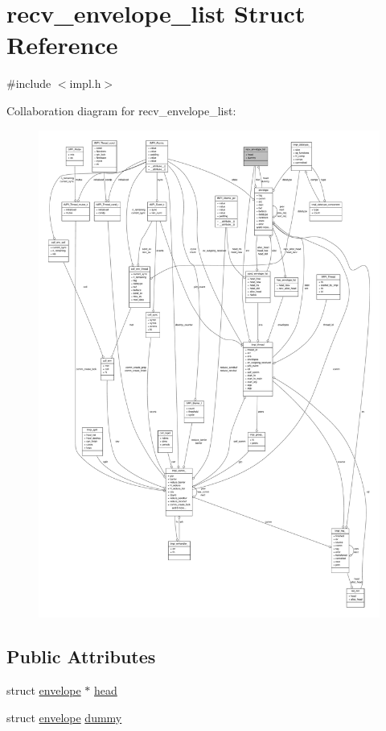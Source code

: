 \hypertarget{structrecv__envelope__list}{\section{recv\-\_\-envelope\-\_\-list \-Struct \-Reference}
\label{structrecv__envelope__list}
}


{\ttfamily \#include $<$impl.\-h$>$}



\-Collaboration diagram for recv\-\_\-envelope\-\_\-list\-:
\nopagebreak
\begin{figure}[H]
\begin{center}
\leavevmode
\includegraphics[width=350pt]{structrecv__envelope__list__coll__graph}
\end{center}
\end{figure}
\subsection*{\-Public \-Attributes}
\begin{DoxyCompactItemize}
\item 
struct \hyperlink{structenvelope}{envelope} $\ast$ \hyperlink{structrecv__envelope__list_af67f0aa27a2161f06680e99a013da1ca}{head}
\item 
struct \hyperlink{structenvelope}{envelope} \hyperlink{structrecv__envelope__list_aaed023cf4534c425f765ef0a523bc11a}{dummy}
\end{DoxyCompactItemize}


